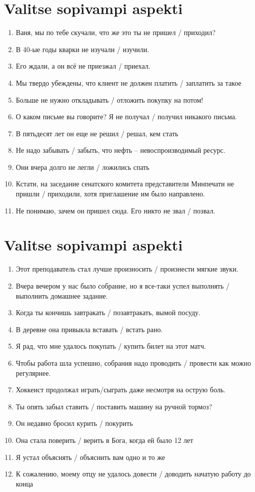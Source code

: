 \documentclass[paper=a4, fontsize=11pt]{scrartcl}
\begin{document}
\section{Valitse sopivampi aspekti} 

\begin{enumerate}
    \item Ваня, мы по тебе скучали, что же это ты не пришел / приходил?
    \item В 40-ые годы кварки не изучали / изучили.
    \item Его ждали, а он всё не приезжал / приехал.
    \item Мы твердо убеждены, что клиент не должен  платить / заплатить за такое
    \item Больше не нужно откладывать / отложить покупку на потом! 
    \item О каком письме вы говорите? Я не получал / получил никакого письма.
    \item В пятьдесят лет он еще не решил / решал, кем стать
    \item Не надо забывать / забыть, что нефть -- невоспроизводимый ресурс.
    \item Они вчера долго не легли / ложились спать
    \item Кстати, на заседание сенатского комитета представители Минпечати не пришли / приходили, хотя приглашение им было направлено.
    \item Не понимаю, зачем он пришел сюда. Его никто не звал / позвал.
\end{enumerate}



\section{Valitse sopivampi aspekti} 

\begin{enumerate}
    \item Этот преподаватель стал лучше произносить / произнести мягкие звуки.
    \item Вчера вечером у нас было собрание, но я все-таки успел выполнять / выполнить домашнее задание.
    \item Когда ты кончишь завтракать / позавтракать, вымой посуду.
    \item В деревне она привыкла вставать / встать рано.
    \item Я рад, что мне удалось покупать / купить билет на этот матч.
    \item Чтобы работа шла успешно, собрания надо проводить / провести как можно регулярнее.
    \item Хоккеист продолжал играть/сыграть даже несмотря на острую боль.
    \item Ты опять забыл ставить / поставить машину на ручной тормоз?
    \item Он недавно бросил курить / покурить
    \item Она стала поверить / верить в Бога, когда ей было 12 лет
    \item Я устал объяснять / объяснить вам одно и то же
    \item К сожалению, моему отцу не удалось довести / доводить начатую работу до конца
\end{enumerate}
\end{document}
